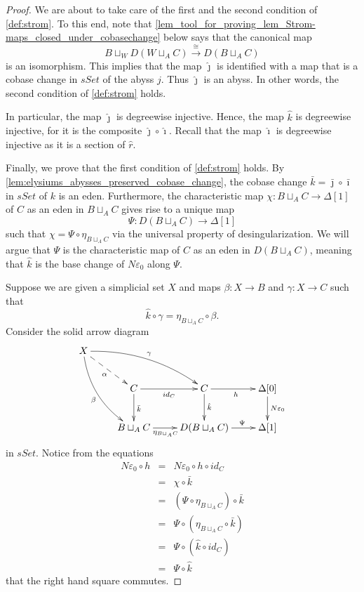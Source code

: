 \begin{proof}
We are about to take care of the first and the second condition of \cref{def:strom}. To this end, note that \cref{lem_tool_for_proving_lem_Strom-maps_closed_under_cobasechange} below says that the canonical map
\[B\sqcup _WD(W\sqcup _AC)\xrightarrow{\cong } D(B\sqcup _AC)\]
is an isomorphism. This implies that the map $\hat{\jmath }$ is identified with a map that is a cobase change in $sSet$ of the abyss $j$. Thus $\hat{\jmath }$ is an abyss. In other words, the second condition of \cref{def:strom} holds.

In particular, the map $\hat{\jmath }$ is degreewise injective. Hence, the map $\hat{k}$ is degreewise injective, for it is the composite $\hat{\jmath } \circ \hat{\imath }$. Recall that the map $\hat{\imath }$ is degreewise injective as it is a section of $\hat{r}$.

Finally, we prove that the first condition of \cref{def:strom} holds. By \cref{lem:elysiums_abysses_preserved_cobase_change}, the cobase change $\bar{k} =\bar{\jmath } \circ \bar{\imath }$ in $sSet$ of $k$ is an eden. Furthermore, the characteristic map $\chi :B\sqcup _AC\to \Delta [1]$ of $C$ as an eden in $B\sqcup _AC$ gives rise to a unique map
\[\Psi :D(B\sqcup _AC)\to \Delta [1]\]
such that $\chi =\Psi \circ \eta _{B\sqcup _AC}$ via the universal property of desingularization. We will argue that $\Psi$ is the characteristic map of $C$ as an eden in $D(B\sqcup _AC)$, meaning that $\hat{k}$ is the base change of $N\varepsilon _0$ along $\Psi$.

Suppose we are given a simplicial set $X$ and maps $\beta :X\to B$ and $\gamma :X\to C$ such that
\begin{equation}
\label{eq:proof_first_condition_Strom-maps_closed_under_cobasechange}
\hat{k} \circ \gamma =\eta _{B\sqcup _AC}\circ \beta .
\end{equation}
Consider the solid arrow diagram
\begin{displaymath}
\xymatrix{
X \ar@/_1pc/[ddr]_\beta \ar@{-->}[dr]_\alpha \ar@/^1pc/[drr]^\gamma \\
& C \ar[d]^{\bar{k} } \ar[r]_{id_C} & C \ar[d]^(.45){\hat{k} } \ar[r]_h & \Delta [0] \ar[d]^{N\varepsilon _0} \\
& B\sqcup _AC \ar[r]_(.45){\eta _{B\sqcup _AC}} & D(B\sqcup _AC) \ar[r]^(.6)\Psi & \Delta [1]
}
\end{displaymath}
in $sSet$. Notice from the equations
\begin{displaymath}
\begin{array}{rcl}
N\varepsilon _0\circ h & = & N\varepsilon _0\circ h\circ id_C \\
& = & \chi \circ \bar{k} \\
& = & (\Psi \circ \eta _{B\sqcup _AC})\circ \bar{k} \\
& = & \Psi \circ (\eta _{B\sqcup _AC}\circ \bar{k} ) \\
& = & \Psi \circ (\hat{k} \circ id_C) \\
& = & \Psi \circ \hat{k}
\end{array}
\end{displaymath}
that the right hand square commutes.


\end{proof}

